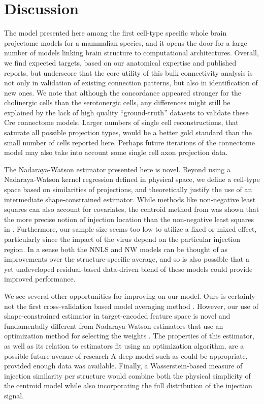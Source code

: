 \section{Discussion}

The model presented here among the first cell-type specific whole brain projectome models for a mammalian species, and it opens the door for a large number of models linking brain structure to computational architectures. 
Overall, we find expected targets, based on our anatomical expertise and published reports, but underscore that the core utility of this bulk connectivity analysis is not only in validation of existing connection patterns, but also in identification of new ones.
We note that although the concordance appeared stronger for the cholinergic cells than the serotonergic cells, any differences might still be explained by the lack of high quality “ground-truth” datasets to validate these Cre connectome models.
Larger numbers of single cell reconstructions, that saturate all possible projection types, would be a better gold standard than the small number of cells reported here.
Perhaps future iterations of the connectome model may also take into account some single cell axon projection data.

The Nadaraya-Watson estimator presented here is novel.
Beyond using a Nadaraya-Watson kernel regression defined in physical space, we define a cell-type space based on similarities of projections, and theoretically justify the use of an intermediate shape-constrained estimator. 
While methods like non-negative least squares can also account for covariates, the centroid method from \citet{Knox2019-ot} was shown that the more precise notion of injection location than the non-negative least squares in \citet{Oh2014-kh}.
Furthermore, our sample size seems too low to utilize a fixed or mixed effect, particularly since the impact of the virus depend on the particular injection region.
In a sense both the NNLS and NW models can be thought of as improvements over the structure-specific average, and so is also possible that a yet undeveloped residual-based data-driven blend of these models could provide improved performance.

We see several other opportunities for improving on our model.
Ours is certainly not the first cross-validation based model averaging method \citet{Gao2016-qe}.
However, our use of shape-constrained estimator in target-encoded feature space is novel and fundamentally different from Nadaraya-Watson estimators that use an optimization method for selecting the weights \citep{Saul2003-th}.
The properties of this estimator, as well as its relation to estimators fit using an optimization algorithm, are a possible future avenue of research \citep{Groeneboom2018-ow, Salha_undated-ev}
A deep model such as \citet{Lotfollahi2019-tr} could be appropriate, provided enough data was available.
Finally, a Wasserstein-based measure of injection similarity per structure would combine both the physical simplicity of the centroid model while also incorporating the full distribution of the injection signal.

